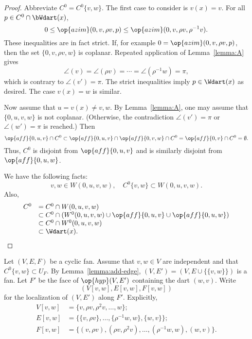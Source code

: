 \begin{proof}  Abbreviate $C^0 = C^0\{v,w\}$.  The first case to consider is $v(x)=v$.  For all $p\in C^0\cap \bWdart(x)$, 
$$
0 \le \op{azim}(0,v,\rho v,p) \le \op{azim}(0,v,\rho v,\rho^{-1} v).
$$  
These inequalities are in fact strict.  If, for example $0 = \op{azim}(0,v,\rho v,p)$, then
the set $\{0,v,\rho v,w\}$ is coplanar.  Repeated application of Lemma~\ref{lemma:A} gives
$$
\angle(v) = \angle(\rho v) = \cdots = \angle(\rho^{-1} w) = \pi,
$$
which is contrary to $\angle(v') = \pi$.  
The strict inequalities imply $p\in \Wdart(x)$ as desired.  The case $v(x)=w$ is similar.

Now assume that $u=v(x)\ne v,w$.  
By Lemma~\ref{lemma:A},  one may assume that $\{0,u,v,w\}$ is not coplanar. 
(Otherwise, the contradiction $\angle(v')=\pi$ or $\angle(w')=\pi$ is reached.) Then
$$
\op{aff}\{0,u,v\}\cap C^0 \subset \op{aff}\{0,u,v\}\cap \op{aff}\{0,v,w\} \cap C^0 = \op{aff}\{0,v\} \cap C^0 = \emptyset.
$$
Thus, $C^0$ is disjoint from $\op{aff}\{0,u,v\}$ and is similarly disjoint from $\op{aff}\{0,u,w\}$.  

We have the following facts:
$$
v,w\in W(0,u,v,w),\quad C^0\{v,w\} \subset W(0,u,v,w).
$$
Also,
$$
\begin{array}{rll}
C^0 &= C^0\cap W(0,u,v,w) \\
     &\subset C^0 \cap (W^0(0,u,v,w) \cup \op{aff}\{0,u,v\} \cup \op{aff}\{0,u,w\})\\
     &\subset C^0 \cap W^0(0,u,v,w)\\
     &\subset \Wdart(x).
\end{array}
$$
\end{proof}


\begin{definition} Let $(V,E,F)$ be a cyclic fan.  Assume that $v,w\in V$ are
independent and that $C^0\{v,w\}\subset U_F$.  By Lemma~\ref{lemma:add-edge},
$(V,E')=(V,E\cup \{\{v,w\}\})$ is a fan.  Let $F'$ be the face of $\op{hyp}(V,E')$ 
containing the dart $(w,v)$.  Write
$$(V[v,w],E[v,w],F[v,w])$$
for the localization of $(V,E')$ along $F'$.  Explicitly,
$$
\begin{array}{lll}
V[v,w] &= \{v,\rho v,\rho^2 v,\ldots,w\};\\
E[v,w] &= \{\{v,\rho v\},\ldots,\{\rho^{-1}w,w\},\{w,v\}\};\\
F[v,w] &= \{(v,\rho v),(\rho v,\rho^2 v),\ldots,(\rho^{-1}w,w),(w,v)\}.
\end{array}
$$
\end{definition}
%

